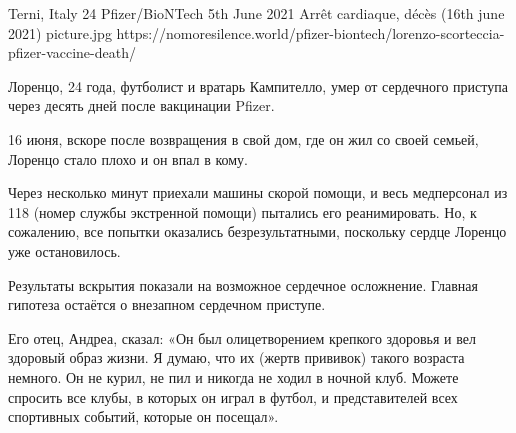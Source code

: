           {Terni, Italy}
          {24}
          {Pfizer/BioNTech}
          {5th June 2021}
          {
            Arrêt cardiaque,
            décès (16th june 2021)
          }
          {picture.jpg}
          {https://nomoresilence.world/pfizer-biontech/lorenzo-scorteccia-pfizer-vaccine-death/}
          {

Лоренцо, 24 года, футболист и вратарь Кампителло, умер от сердечного приступа
через десять дней после вакцинации Pfizer.

16 июня, вскоре после возвращения в свой дом, где он жил со своей семьей,
Лоренцо стало плохо и он впал в кому.

Через несколько минут приехали машины скорой помощи, и весь медперсонал из 118
(номер службы экстренной помощи) пытались его реанимировать. Но, к сожалению,
все попытки оказались безрезультатными, поскольку сердце Лоренцо уже
остановилось.

Результаты вскрытия показали на возможное сердечное осложнение. Главная гипотеза
остаётся о внезапном сердечном приступе.

Его отец, Андреа, сказал: «Он был олицетворением крепкого здоровья и вел
здоровый образ жизни. Я думаю, что их (жертв прививок) такого возраста
немного. Он не курил, не пил и никогда не ходил в ночной клуб. Можете спросить
все клубы, в которых он играл в футбол, и представителей всех спортивных
событий, которые он посещал».

}
